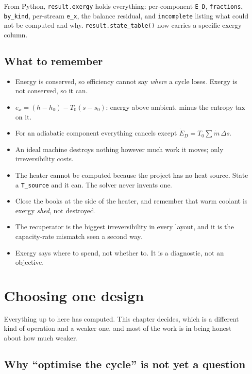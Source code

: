 \documentclass[11pt,a4paper]{report}
\newcommand{\code}[1]{\texttt{\small #1}}
\begin{document}
\noindent From Python, \code{result.exergy} holds everything:
per-component \code{E\_D}, \code{fractions}, \code{by\_kind},
per-stream \code{e\_x}, the balance residual, and \code{incomplete} listing
what could not be computed and why. \code{result.state\_table()} now carries
a specific-exergy column.

\section{What to remember}

\begin{itemize}\itemsep2pt
\item Energy is conserved, so efficiency cannot say \emph{where} a cycle
      loses. Exergy is not conserved, so it can.
\item $e_x = (h-h_0) - T_0(s-s_0)$: energy above ambient, minus the entropy
      tax on it.
\item For an adiabatic component everything cancels except
      $\dot E_D = T_0 \sum \dot m\,\Delta s$.
\item An ideal machine destroys nothing however much work it moves; only
      irreversibility costs.
\item The heater cannot be computed because the project has no heat source.
      State a \code{T\_source} and it can. The solver never invents one.
\item Close the books at the  side of the heater, and remember that
      warm coolant is exergy \emph{shed}, not destroyed.
\item The recuperator is the biggest irreversibility in every layout, and it
      is the capacity-rate mismatch seen a second way.
\item Exergy says where to spend, not whether to. It is a diagnostic, not an
      objective.
\end{itemize}

\chapter{Choosing one design}
\label{ch:choosing}

Everything up to here has computed. This chapter decides, which is a
different kind of operation and a weaker one, and most of the work is in
being honest about how much weaker.

\section{Why ``optimise the cycle'' is not yet a question}
\end{document}
